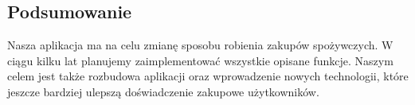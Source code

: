 \documentclass[12pt,a4paper]{article}
\begin{document}
\subsection*{Podsumowanie}

Nasza aplikacja ma na celu zmianę sposobu robienia zakupów spożywczych.
W ciągu kilku lat planujemy zaimplementować wszystkie opisane funkcje.
Naszym celem jest także rozbudowa aplikacji oraz wprowadzenie nowych technologii,
które jeszcze bardziej ulepszą doświadczenie zakupowe użytkowników.
\end{document}

